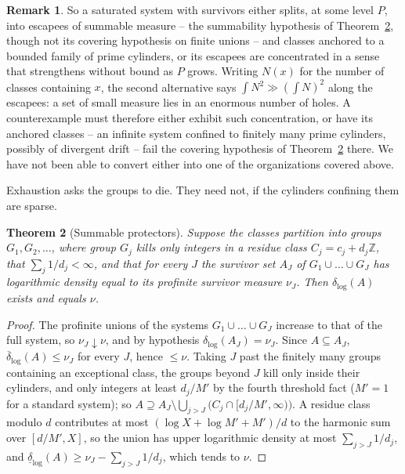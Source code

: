 \documentclass[11pt]{article}
\theoremstyle{plain}
\newtheorem{theorem}{Theorem}[section]
\theoremstyle{definition}
\newtheorem{remark}[theorem]{Remark}
\newcommand{\dlog}{\delta_{\log}}
\begin{document}
\begin{remark}
So a saturated system with survivors either splits, at some
level $P$, into escapees of summable measure -- the summability
hypothesis of Theorem~\ref{thm:confined}, though not its
covering hypothesis on finite unions -- and classes anchored to
a bounded family of prime cylinders, or its escapees are
concentrated in a sense that strengthens without bound as $P$
grows.  Writing $N(x)$ for the
number of classes containing $x$, the second alternative says
$\int N^2\gg(\int N)^2$ along the escapees: a set of small
measure lies in an enormous number of holes.  A counterexample
must therefore either exhibit such concentration, or have its
anchored classes -- an infinite system confined to finitely many
prime cylinders, possibly of divergent drift -- fail the
covering hypothesis of Theorem~\ref{thm:confined} there.  We
have not been able to convert either into one of the
organizations covered above.
\end{remark}

Exhaustion asks the groups to die.  They need not, if the
cylinders confining them are sparse.

\begin{theorem}[Summable protectors]\label{thm:confined}
Suppose the classes partition into groups $G_1,G_2,\dots$, where
group $G_j$ kills only integers in a residue class
$C_j=c_j+d_j\mathbb{Z}$, that $\sum_j1/d_j<\infty$, and that for
every $J$ the survivor set $A_J$ of $G_1\cup\dots\cup G_J$ has
logarithmic density equal to its profinite survivor measure
$\nu_J$.  Then $\dlog(A)$ exists and equals $\nu$.
\end{theorem}

\begin{proof}
The profinite unions of the systems $G_1\cup\dots\cup G_J$ increase to that of
the full system, so $\nu_J\downarrow\nu$, and by hypothesis
$\dlog(A_J)=\nu_J$.  Since $A\subseteq A_J$,
$\overline{\delta}_{\log}(A)\le\nu_J$ for every $J$, hence
$\le\nu$.  Taking $J$ past the finitely many groups containing an
exceptional class, the groups beyond $J$ kill only inside their
cylinders, and only integers at least $d_j/M'$ by the fourth
threshold fact ($M'=1$ for a standard system); so
$A\supseteq A_J\setminus\bigcup_{j>J}\bigl(C_j\cap[d_j/M',\infty)\bigr)$.
A residue class modulo $d$ contributes at most
$(\log X+\log M'+M')/d$ to the harmonic sum over $[d/M',X]$, so the union has
upper logarithmic density at most $\sum_{j>J}1/d_j$, and
$\underline{\delta}_{\log}(A)\ge\nu_J-\sum_{j>J}1/d_j$, which
tends to $\nu$.
\end{proof}
\end{document}
